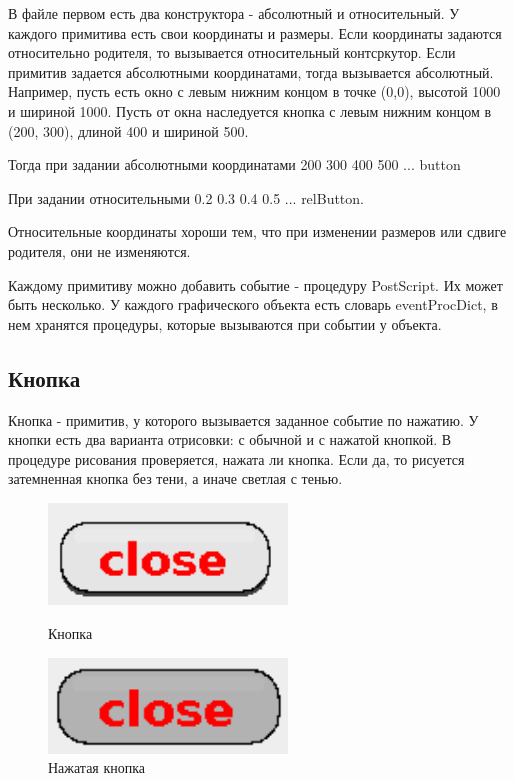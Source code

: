 \documentclass[14pt]{extarticle}
\begin{document}
		В файле первом есть два конструктора - абсолютный и относительный. У каждого примитива есть свои координаты и размеры. Если координаты задаются относительно родителя, то вызывается относительный контсркутор. Если примитив задается абсолютными координатами, тогда вызывается абсолютный. Например, пусть есть окно с левым нижним концом в точке (0,0), высотой 1000 и шириной 1000. Пусть от окна наследуется кнопка с левым нижним концом в (200, 300), длиной 400 и шириной 500. 
		
		Тогда при задании абсолютными координатами 		
		200 300 400 500 ... button
		
При задании относительными
		0.2 0.3 0.4 0.5	... relButton.
		
		
Относительные координаты хороши тем, что при изменении размеров или сдвиге родителя, они не изменяются.

Каждому примитиву можно добавить событие - процедуру PostScript. Их может быть несколько. У каждого графического объекта есть словарь eventProcDict, в нем хранятся процедуры, которые вызываются при событии у объекта. 
	
	\subsection{Кнопка}
	Кнопка - примитив, у которого вызывается заданное событие по нажатию. У кнопки есть два варианта отрисовки: с обычной и с нажатой кнопкой. В процедуре рисования проверяется, нажата ли кнопка. Если да, то рисуется затемненная кнопка без тени, а иначе светлая с тенью.
		\begin{figure}[h]
		\begin{center}
		\begin{minipage}[h]{0.4\linewidth}
		\includegraphics[width=180pt]{pictures/close1.png}
		\caption{ Кнопка} %
		\label{ris:b1} %
		\end{minipage}
		\hfill 
		\begin{minipage}[h]{0.4\linewidth}
		\includegraphics[width=180pt]{pictures/close2.png}
		\caption{Нажатая кнопка}
		\label{ris:b2}
		\end{minipage}
		\end{center}
		\end{figure}	
		
\end{document}
